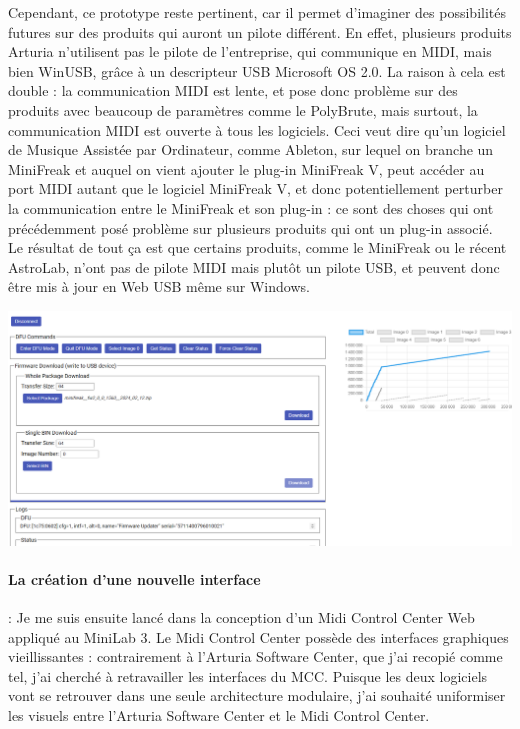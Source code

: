 \documentclass[francais]{rapportPFE}  %
\begin{document}
Cependant, ce prototype reste pertinent, car il permet d'imaginer des possibilités futures sur des produits qui auront un pilote différent.
En effet, plusieurs produits Arturia n'utilisent pas le pilote de l'entreprise, qui communique en MIDI, mais bien WinUSB, grâce à un descripteur USB Microsoft OS 2.0. La raison à cela est double : la communication MIDI est lente, et pose donc problème sur des produits avec beaucoup de paramètres comme le PolyBrute, mais surtout, la communication MIDI est ouverte à tous les logiciels. Ceci veut dire qu'un logiciel de Musique Assistée par Ordinateur, comme Ableton, sur lequel on branche un MiniFreak et auquel on vient ajouter le plug-in MiniFreak V, peut accéder au port MIDI autant que le logiciel MiniFreak V, et donc potentiellement perturber la communication entre le MiniFreak et son plug-in : ce sont des choses qui ont précédemment posé problème sur plusieurs produits qui ont un plug-in associé.
Le résultat de tout ça est que certains produits, comme le MiniFreak ou le récent AstroLab, n'ont pas de pilote MIDI mais plutôt un pilote USB, et peuvent donc être mis à jour en Web USB même sur Windows.



\begin{center}
	\centering
	\includegraphics[width=15cm]{graphics/dfu.png}
	\begin{tiny}
	\end{tiny}
	\label{fig}
\end{center}


\paragraph{La création d'une nouvelle interface}:
Je me suis ensuite lancé dans la conception d'un Midi Control Center Web appliqué au MiniLab 3.
Le Midi Control Center possède des interfaces graphiques vieillissantes : contrairement à l'Arturia Software Center, que j'ai recopié comme tel, j'ai cherché à retravailler les interfaces du MCC. Puisque les deux logiciels vont se retrouver dans une seule architecture modulaire, j'ai souhaité uniformiser les visuels entre l'Arturia Software Center et le Midi Control Center.
\end{document}
